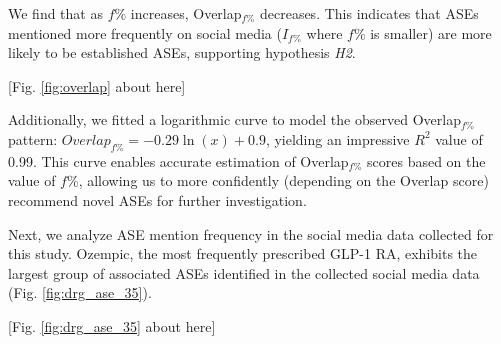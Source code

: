 \documentclass[referee,bst/sn-basic]{sn-jnl}%
\theoremstyle{thmstyletwo}%
\theoremstyle{thmstylethree}%
\begin{document}
We find that as ${f\%}$ increases, Overlap$_{f\%}$ decreases.
This indicates that ASEs mentioned more frequently on social media ($I_{f\%}$ where ${f\%}$ is smaller) are more likely to be established ASEs, supporting hypothesis \textit{H2}.



\begin{center}
    [Fig. \ref{fig:overlap} about here]
\end{center}

\begin{comment}
\begin{figure}[H]
    \centering
    \texttt{[image: images/overlap.pdf]}
    \caption{Overlap score as a function of $I_{f\%}$.
    }
    \label{fig:overlap}
\end{figure}
\end{comment}


Additionally, we fitted a logarithmic curve to model the observed Overlap$_{f\%}$ pattern: $Overlap_{f\%} = -0.29 \ln(x) + 0.9$, yielding an impressive $R^2$ value of 0.99.
This curve enables accurate estimation of Overlap$_{f\%}$ scores based on the value of ${f\%}$, allowing us to more confidently (depending on the Overlap score) recommend novel ASEs for further investigation.

Next, we analyze ASE mention frequency in the social media data collected for this study. Ozempic, the most frequently prescribed GLP-1 RA, exhibits the largest group of associated ASEs identified in the collected social media data (Fig. \ref{fig:drg_ase_35}).

\begin{center}
    [Fig. \ref{fig:drg_ase_35} about here]
\end{center}

\begin{comment}
\begin{figure}
    \ContinuedFloat
    \centering
    \begin{subfigure}[b]{\textwidth}
        \centering
        \texttt{[image: images/1.pdf]}
        \label{fig:drg_ase_35a}
    \end{subfigure}
    \stepcounter{figure} %
    \caption{ASE mention frequency ($>1$) on $\mathbb{X}$ and Reddit for each GLP-1 receptor agonist.}
    \label{fig:drg_ase_35}
\end{figure}
\end{comment}
\end{document}
